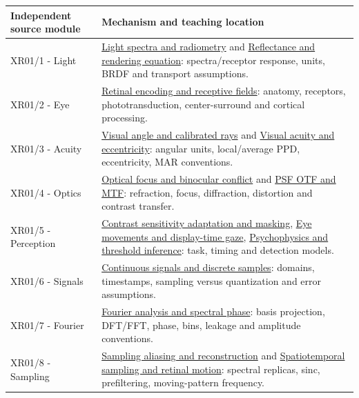 {\def\LTcaptype{none} %
\begin{longtable}[]{@{}
  >{\raggedright\arraybackslash}p{}
  >{\raggedright\arraybackslash}p{}@{}}
\toprule\noalign{}
\begin{minipage}[b]{\linewidth}\raggedright
Independent source module
\end{minipage} & \begin{minipage}[b]{\linewidth}\raggedright
Mechanism and teaching location
\end{minipage} \\
\midrule\noalign{}
\endhead
\bottomrule\noalign{}
\endlastfoot
XR01/1 - Light & \hyperref[appendix-215c2570199b]{Light spectra and radiometry} and \hyperref[appendix-96da0b153b77]{Reflectance and rendering equation}: spectra/receptor response, units, BRDF and transport assumptions. \\
XR01/2 - Eye & \hyperref[appendix-7281c15ac44a]{Retinal encoding and receptive fields}: anatomy, receptors, phototransduction, center-surround and cortical processing. \\
XR01/3 - Acuity & \hyperref[appendix-7d356c396d1a]{Visual angle and calibrated rays} and \hyperref[appendix-b491fc48c54b]{Visual acuity and eccentricity}: angular units, local/average PPD, eccentricity, MAR conventions. \\
XR01/4 - Optics & \hyperref[appendix-f90cee1be7a4]{Optical focus and binocular conflict} and \hyperref[appendix-8b76b0efd27f]{PSF OTF and MTF}: refraction, focus, diffraction, distortion and contrast transfer. \\
XR01/5 - Perception & \hyperref[appendix-b3aa9e8e01ad]{Contrast sensitivity adaptation and masking}, \hyperref[appendix-a6f2c4fe1996]{Eye movements and display-time gaze}, \hyperref[appendix-1759f03e8ce7]{Psychophysics and threshold inference}: task, timing and detection models. \\
XR01/6 - Signals & \hyperref[appendix-1077ea8fc737]{Continuous signals and discrete samples}: domains, timestamps, sampling versus quantization and error assumptions. \\
XR01/7 - Fourier & \hyperref[appendix-b60686ba06a1]{Fourier analysis and spectral phase}: basis projection, DFT/FFT, phase, bins, leakage and amplitude conventions. \\
XR01/8 - Sampling & \hyperref[appendix-6a7869dd79a6]{Sampling aliasing and reconstruction} and \hyperref[appendix-70895739febb]{Spatiotemporal sampling and retinal motion}: spectral replicas, sinc, prefiltering, moving-pattern frequency. \\

\end{longtable}}
